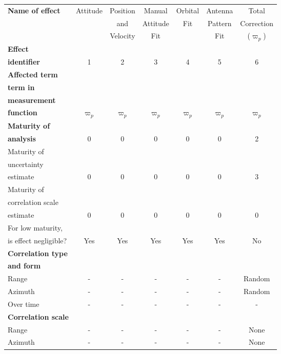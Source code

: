 \begin{table}[ht]
  \begin{tabular}{|l|c|c|c|c|c|c|}
    \hline
    \textbf{Name of effect} & Attitude & Position & Manual & Orbital & Antenna & Total\\
    & & and & Attitude & Fit & Pattern & Correction\\
    & & Velocity & Fit & & Fit & ($\varpi_p$) \\ \hline
    \textbf{Effect} &  &  &  &  & & \\
    \textbf{identifier} & 1 & 2 & 3 & 4 & 5 & 6 \\ \hline
    \textbf{Affected term} &  &  &  &  & & \\
    \textbf{term in} &  &  &  &  &  &\\
    \textbf{measurement} &  &  &  &  &  &\\
    \textbf{function} & $\varpi_p$ & $\varpi_p$  & $\varpi_p$  & $\varpi_p$  & $\varpi_p$ & $\varpi_p$ \\ \hline
    \textbf{Maturity of} &  &  &  &  & & \\
    \textbf{analysis} & 0 & 0 & 0 & 0 & 0 & 2 \\ \hline
    Maturity of &  & &  &  & &  \\
    uncertainty &  & &  &  & &  \\
    estimate & 0& 0& 0& 0&0 & 3 \\ \hline
    Maturity of &  & &  &  & &  \\
    correlation scale &  & &  &  & &  \\
    estimate &  0& 0&  0&  0& 0& 0 \\ \hline
    For low maturity, &  & &  &  & &  \\
    is effect negligible? &  Yes& Yes&  Yes&  Yes&  Yes& No\\ \hline
    \textbf{Correlation type} &  & &  &  &  &\\
    \textbf{and form} &  & &  &  &   &\\ \hline
    Range & - & - & - & - & - & Random \\ \hline
    Azimuth & - & - & - & - & - & Random \\ \hline
    Over time & - & - & - & - & - & - \\ \hline
    \textbf{Correlation scale} &  & & &  &  &  \\ \hline
    Range     & - & - & - & - & - & None\\ \hline
    Azimuth   & - & - & - & - & - & None\\ \hline

\end{tabular}
\end{table}
